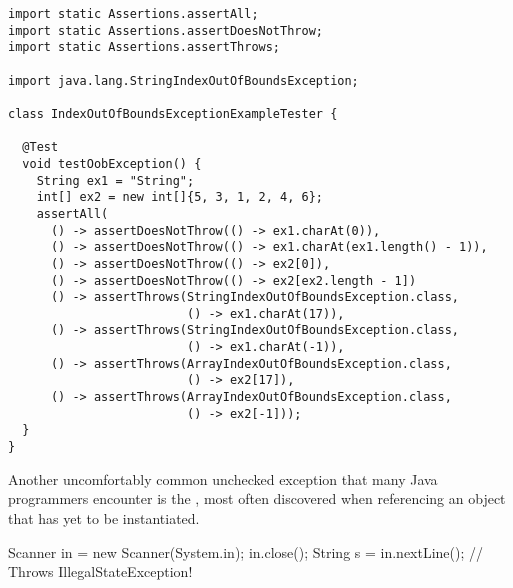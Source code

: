 \begin{lstlisting}[language=MyJava]
import static Assertions.assertAll;
import static Assertions.assertDoesNotThrow;
import static Assertions.assertThrows;

import java.lang.StringIndexOutOfBoundsException;

class IndexOutOfBoundsExceptionExampleTester {

  @Test
  void testOobException() {
    String ex1 = "String";
    int[] ex2 = new int[]{5, 3, 1, 2, 4, 6}; 
    assertAll(
      () -> assertDoesNotThrow(() -> ex1.charAt(0)),
      () -> assertDoesNotThrow(() -> ex1.charAt(ex1.length() - 1)),
      () -> assertDoesNotThrow(() -> ex2[0]),
      () -> assertDoesNotThrow(() -> ex2[ex2.length - 1])
      () -> assertThrows(StringIndexOutOfBoundsException.class, 
                         () -> ex1.charAt(17)),
      () -> assertThrows(StringIndexOutOfBoundsException.class, 
                         () -> ex1.charAt(-1)),
      () -> assertThrows(ArrayIndexOutOfBoundsException.class,  
                         () -> ex2[17]),
      () -> assertThrows(ArrayIndexOutOfBoundsException.class, 
                         () -> ex2[-1]));
  } 
}
\end{lstlisting} 

Another uncomfortably common unchecked exception that many Java programmers encounter is the , most often discovered when referencing an object that has yet to be instantiated. 


\begin{verbnobox}[\small]
Scanner in = new Scanner(System.in);
in.close();
String s = in.nextLine(); // Throws IllegalStateException!
\end{verbnobox}
